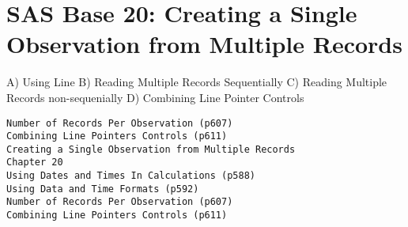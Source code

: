 \newpage
\section{SAS Base 20: Creating a Single Observation from Multiple Records}

A) Using Line
B) Reading Multiple Records Sequentially
C) Reading Multiple Records non-sequenially
D) Combining Line Pointer Controls

\begin{verbatim}
Number of Records Per Observation (p607)
Combining Line Pointers Controls (p611)
Creating a Single Observation from Multiple Records
Chapter 20
Using Dates and Times In Calculations (p588)
Using Data and Time Formats (p592)
Number of Records Per Observation (p607)
Combining Line Pointers Controls (p611)
\end{verbatim}

\newpage
